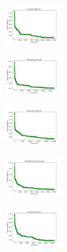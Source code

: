 \begin{figure}[H]
    \centering
    \begin{subfigure}
        \centering
        \includegraphics[width=0.234\textwidth]{img/hs/iris_set_const_20_949004259_cost.png}
    \end{subfigure}
    \hfill
    \begin{subfigure}
        \centering
        \includegraphics[width=0.234\textwidth]{img/hs/ecoli_set_const_20_949004259_cost.png}
    \end{subfigure}
    \hfill
    \begin{subfigure}
        \centering
        \includegraphics[width=0.234\textwidth]{img/hs/rand_set_const_20_949004259_cost.png}
    \end{subfigure}
    \hfill
    \begin{subfigure}
        \centering
        \includegraphics[width=0.234\textwidth]{img/hs/newthyroid_set_const_20_949004259_cost.png}
    \end{subfigure}
    \hfill
    \begin{subfigure}
        \centering
        \includegraphics[width=0.234\textwidth]{img/hs/iris_set_const_20_589741062_cost.png}
    \end{subfigure}
    \hfill
    \begin{subfigure}

\end{subfigure}
\end{figure}

